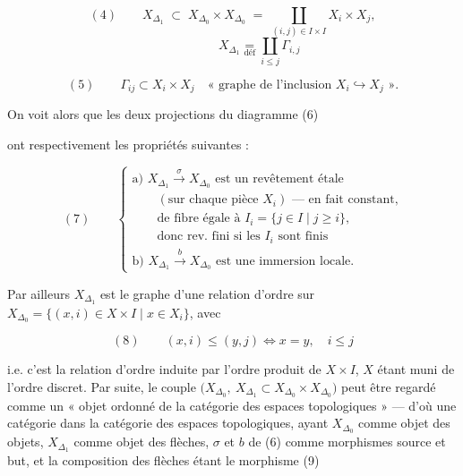 \documentclass[11pt,a4paper]{article}
\begin{document}
\[
  (4) \qquad
  X_{\Delta_1} \;\subset\; X_{\Delta_0} \times X_{\Delta_0}
  \;=\; \coprod_{(i,j) \in I \times I} X_i \times X_j ,
\]
\[
  \phantom{(4)} \qquad
  X_{\Delta_1} \underset{\text{déf}}{=} \coprod_{i \leq j} \Gamma_{i,j}
\]

\[
  (5) \qquad
  \Gamma_{ij} \subset X_i \times X_j \quad
  \text{« graphe de l'inclusion } X_i \hookrightarrow X_j \text{ ».}
\]

On voit alors que les deux projections du diagramme (6)


ont respectivement les propriétés suivantes :

\[
  (7) \qquad
  \begin{cases}
    \text{a) } X_{\Delta_1} \xrightarrow{\ \sigma\ } X_{\Delta_0}
      \text{ est un revêtement étale} \\
    \qquad (\text{sur chaque pièce } X_i)
      \text{ — en fait constant,} \\
    \qquad \text{de fibre égale à } I_i = \{ j \in I \mid j \geq i \}, \\
    \qquad \text{donc rev. fini si les } I_i \text{ sont finis} \\
    \text{b) } X_{\Delta_1} \xrightarrow{\ b\ } X_{\Delta_0}
      \text{ est une immersion locale.}
  \end{cases}
\]

Par ailleurs $X_{\Delta_1}$ est le graphe d'une relation d'ordre sur
$X_{\Delta_0} = \{ (x,i) \in X \times I \mid x \in X_i \}$, avec

\[
  (8) \qquad (x,i) \leq (y,j) \iff x = y, \quad i \leq j
\]

i.e. c'est la relation d'ordre induite par l'ordre produit de $X \times I$,
$X$ étant \struck{\ill} muni de l'ordre discret. Par suite, le couple
$\bigl( X_{\Delta_0},\ X_{\Delta_1} \subset X_{\Delta_0} \times X_{\Delta_0}
\bigr)$ peut être regardé comme un « objet ordonné de la catégorie des espaces
topologiques » — d'où une catégorie dans la catégorie des espaces
topologiques, ayant $X_{\Delta_0}$ comme objet des objets, $X_{\Delta_1}$
comme objet des flèches, $\sigma$ et $b$ de (6) comme morphismes source et
but, et la composition des flèches étant le morphisme (9)
\end{document}
